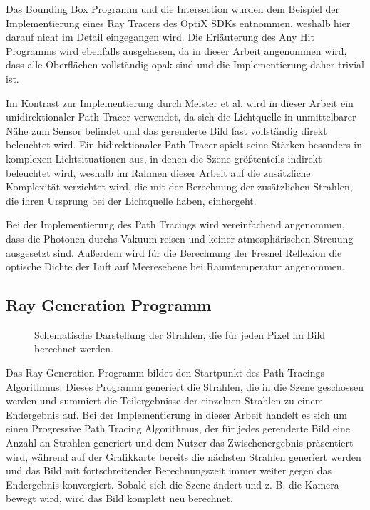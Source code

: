 \documentclass[thesis.tex]{subfiles}
\begin{document}
Das Bounding Box Programm und die Intersection wurden dem Beispiel der Implementierung eines Ray Tracers des OptiX SDKs entnommen, weshalb hier darauf nicht im Detail eingegangen wird. Die Erläuterung des Any Hit Programms wird ebenfalls ausgelassen, da in dieser Arbeit angenommen wird, dass alle Oberflächen vollständig opak sind und die Implementierung daher trivial ist. 

Im Kontrast zur Implementierung durch Meister et al. \cite{bib:Meister2013} wird in dieser Arbeit ein unidirektionaler Path Tracer verwendet, da sich die Lichtquelle in unmittelbarer Nähe zum Sensor befindet und das gerenderte Bild fast vollständig direkt beleuchtet wird. Ein bidirektionaler Path Tracer spielt seine Stärken besonders in komplexen Lichtsituationen aus, in denen die Szene größtenteils indirekt beleuchtet wird, weshalb im Rahmen dieser Arbeit auf die zusätzliche Komplexität verzichtet wird, die mit der Berechnung der zusätzlichen Strahlen, die ihren Ursprung bei der Lichtquelle haben, einhergeht.

Bei der Implementierung des Path Tracings wird vereinfachend angenommen, dass die Photonen durchs Vakuum reisen und keiner atmosphärischen Streuung ausgesetzt sind. Außerdem wird für die Berechnung der Fresnel Reflexion die optische Dichte der Luft auf Meeresebene bei Raumtemperatur angenommen.
%
\subsection{Ray Generation Programm}\label{sec:ray_generation_simulation}

\begin{figure}[ht!]
    \centering
    \caption{Schematische Darstellung der Strahlen, die für jeden Pixel im Bild berechnet werden.}
    \label{fig:ray_generation_undistorted}
\end{figure}

Das Ray Generation Programm bildet den Startpunkt des Path Tracings Algorithmus. Dieses Programm generiert die Strahlen, die in die Szene geschossen werden und summiert die Teilergebnisse der einzelnen Strahlen zu einem Endergebnis auf. Bei der Implementierung in dieser Arbeit handelt es sich um einen Progressive Path Tracing Algorithmus, der für jedes gerenderte Bild eine Anzahl an Strahlen generiert und dem Nutzer das Zwischenergebnis präsentiert wird, während auf der Grafikkarte bereits die nächsten Strahlen generiert werden und das Bild mit fortschreitender Berechnungszeit immer weiter gegen das Endergebnis konvergiert. Sobald sich die Szene ändert und z. B. die Kamera bewegt wird, wird das Bild komplett neu berechnet.
\end{document}
